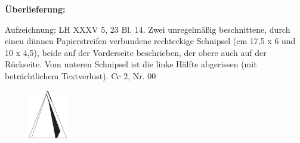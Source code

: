 \begin{ledgroupsized}[r]{120mm}%
\footnotesize%
\pstart%
\noindent\textbf{\"{U}berlieferung:}%
\pend%
\end{ledgroupsized}%
\begin{ledgroupsized}[r]{114mm}%
\footnotesize%
\pstart%
\parindent -6mm%
%
Aufzeichnung:
LH XXXV 5, 23 Bl. 14.
Zwei unregelm\"{a}{\ss}ig beschnittene,
durch einen d\"{u}nnen Papierstreifen verbundene rechteckige Schnipsel
(cm 17,5 x 6 und 10 x 4,5),
beide auf der Vorderseite beschrieben, der obere auch auf der Rückseite.
Vom unteren Schnipsel ist die linke Hälfte abgerissen (mit beträchtlichem Textverlust).
\newline%
Cc 2, Nr. 00%
\pend%
 \end{ledgroupsized}%
%
%
\vspace*{8mm}%
\pstart
\noindent
[14~r\textsuperscript{o}]
\pend
\count{}
\count{}
\count{}
\pstart%
\normalsize%
\noindent%
\centering%
%
\protect{}
\pend%
\vspace{1,0em}%
\pstart%
\noindent%
\begin{figure}%
\vspace{-4mm}\includegraphics[trim = 0mm -4mm -5mm 0mm, clip,width=0.15\textwidth]{images/lh0350523_14r-d.pdf}\\%
%
\end{figure}%
